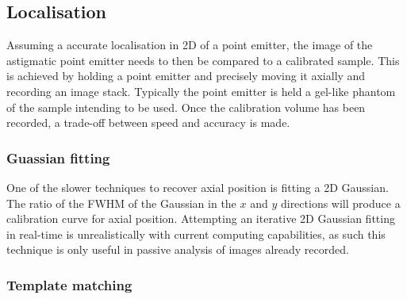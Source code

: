 \subsection{Localisation}

Assuming a accurate localisation in 2D of a point emitter, the image of the astigmatic point emitter needs to then be compared to a calibrated sample.
This is achieved by holding a point emitter and precisely moving it axially and recording an image stack.
Typically the point emitter is held a gel-like phantom of the sample intending to be used.
Once the calibration volume has been recorded, a trade-off between speed and accuracy is made.

\subsubsection{Guassian fitting}
One of the slower techniques to recover axial position is fitting a 2D Gaussian.
The ratio of the FWHM of the Gaussian in the $x$ and $y$ directions will produce a calibration curve for axial position.
Attempting an iterative 2D Gaussian fitting in real-time is unrealistically with current computing capabilities, as such this technique is only useful in passive analysis of images already recorded.

\subsubsection{Template matching}

